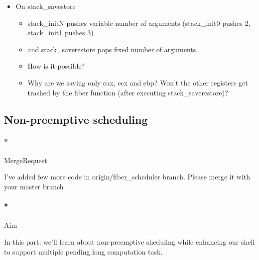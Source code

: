 \documentclass[]{article}
\newenvironment{Shaded}{}{}
\newcommand{\ExtensionTok}[1]{{#1}}
\newcommand{\NormalTok}[1]{{#1}}
\providecommand{\tightlist}{%
  \setlength{\itemsep}{0pt}\setlength{\parskip}{0pt}}
\let\oldparagraph\paragraph
\renewcommand{\paragraph}[1]{\oldparagraph{#1}\mbox{}}
\begin{document}
\begin{itemize}
\tightlist
\item
  On stack\_savestore

  \begin{itemize}
  \tightlist
  \item
    stack\_initN pushes variable number of arguments (stack\_init0
    pushes 2, stack\_init1 pushes 3)
  \item
    and stack\_saverestore pops fixed number of arguments.
  \item
    How is it possible?
  \item
    Why are we saving only eax, ecx and ebp? Won't the other registers
    get trashed by the fiber function (after executing
    stack\_saverestore)?
  \end{itemize}
\end{itemize}

\subsection{Non-preemptive scheduling}\label{non-preemptive-scheduling}

\paragraph*{MergeRequest}\label{mergerequest-6}

I've added few more code in origin/fiber\_scheduler branch. Please merge
it with your master branch

\begin{Shaded}
\end{Shaded}

\paragraph*{Aim}\label{aim-6}

In this part, we'll learn about non-preemptive sheduling while enhancing
our shell to support multiple pending long computation task.
\end{document}
